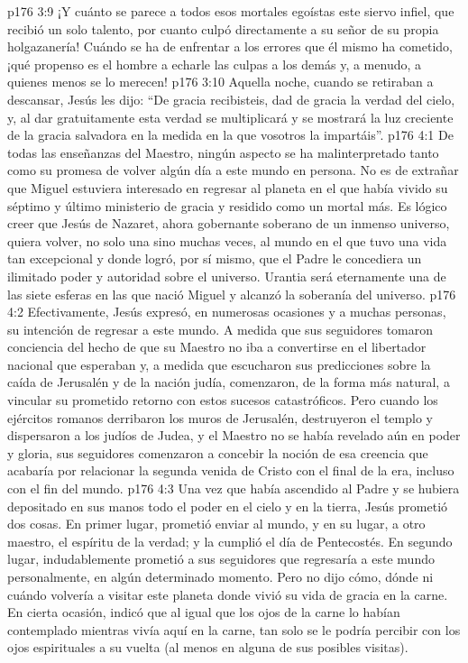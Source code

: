 \vs p176 3:9 ¡Y cuánto se parece a todos esos mortales egoístas este siervo infiel, que recibió un solo talento, por cuanto culpó directamente a su señor de su propia holgazanería! Cuándo se ha de enfrentar a los errores que él mismo ha cometido, ¡qué propenso es el hombre a echarle las culpas a los demás y, a menudo, a quienes menos se lo merecen!
\vs p176 3:10 Aquella noche, cuando se retiraban a descansar, Jesús les dijo: “De gracia recibisteis, dad de gracia la verdad del cielo, y, al dar gratuitamente esta verdad se multiplicará y se mostrará la luz creciente de la gracia salvadora en la medida en la que vosotros la impartáis”.
\vs p176 4:1 De todas las enseñanzas del Maestro, ningún aspecto se ha malinterpretado tanto como su promesa de volver algún día a este mundo en persona. No es de extrañar que Miguel estuviera interesado en regresar al planeta en el que había vivido su séptimo y último ministerio de gracia y residido como un mortal más. Es lógico creer que Jesús de Nazaret, ahora gobernante soberano de un inmenso universo, quiera volver, no solo una sino muchas veces, al mundo en el que tuvo una vida tan excepcional y donde logró, por sí mismo, que el Padre le concediera un ilimitado poder y autoridad sobre el universo. Urantia será eternamente una de las siete esferas en las que nació Miguel y alcanzó la soberanía del universo.
\vs p176 4:2 Efectivamente, Jesús expresó, en numerosas ocasiones y a muchas personas, su intención de regresar a este mundo. A medida que sus seguidores tomaron conciencia del hecho de que su Maestro no iba a convertirse en el libertador nacional que esperaban y, a medida que escucharon sus predicciones sobre la caída de Jerusalén y de la nación judía, comenzaron, de la forma más natural, a vincular su prometido retorno con estos sucesos catastróficos. Pero cuando los ejércitos romanos derribaron los muros de Jerusalén, destruyeron el templo y dispersaron a los judíos de Judea, y el Maestro no se había revelado aún en poder y gloria, sus seguidores comenzaron a concebir la noción de esa creencia que acabaría por relacionar la segunda venida de Cristo con el final de la era, incluso con el fin del mundo.
\vs p176 4:3 Una vez que había ascendido al Padre y se hubiera depositado en sus manos todo el poder en el cielo y en la tierra, Jesús prometió dos cosas. En primer lugar, prometió enviar al mundo, y en su lugar, a otro maestro, el espíritu de la verdad; y la cumplió el día de Pentecostés. En segundo lugar, indudablemente prometió a sus seguidores que regresaría a este mundo personalmente, en algún determinado momento. Pero no dijo cómo, dónde ni cuándo volvería a visitar este planeta donde vivió su vida de gracia en la carne. En cierta ocasión, indicó que al igual que los ojos de la carne lo habían contemplado mientras vivía aquí en la carne, tan solo se le podría percibir con los ojos espirituales a su vuelta (al menos en alguna de sus posibles visitas).

